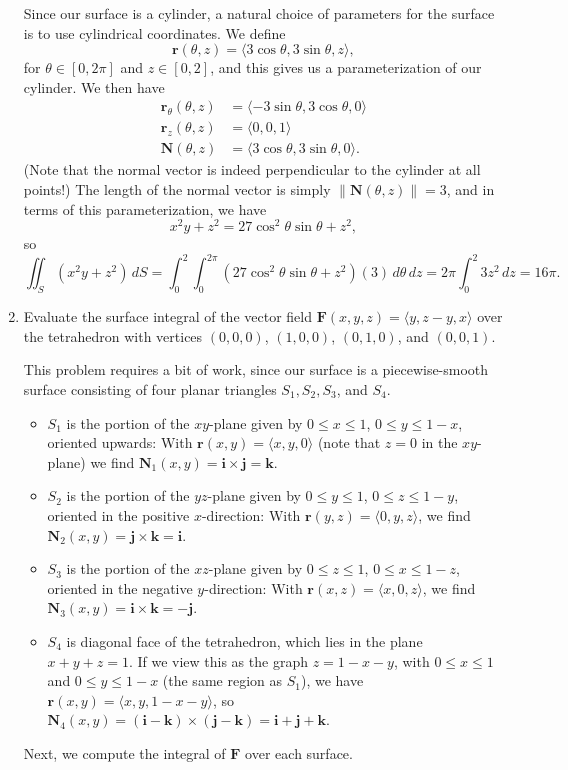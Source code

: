 \documentclass[letterpaper,12pt]{article}
\newcommand{\len}[1]{\lVert #1\rVert}
\newcommand{\F}{\mathbf{F}}
\renewcommand{\r}{\mathbf{r}}
\renewcommand{\i}{\mathbf{i}}
\renewcommand{\j}{\mathbf{j}}
\renewcommand{\k}{\mathbf{k}}
\newcommand{\N}{\mathbf{N}}
\begin{document}
\begin{enumerate}
Since our surface is a cylinder, a natural choice of parameters for the surface is to use cylindrical coordinates. We define
\[
 \r(\theta,z) = \langle 3\cos\theta, 3\sin\theta,z\rangle,
\]
for $\theta\in [0,2\pi]$ and $z\in [0,2]$, and this gives us a parameterization of our cylinder. We then have
\begin{align*}
 \r_\theta(\theta, z) & = \langle -3\sin\theta, 3\cos\theta, 0\rangle\\
 \r_z(\theta, z) & = \langle 0, 0, 1\rangle\\
 \N(\theta,z) & = \langle 3\cos\theta, 3\sin\theta, 0\rangle.
\end{align*}
(Note that the normal vector is indeed perpendicular to the cylinder at all points!) The length of the normal vector is simply $\len{\N(\theta,z)} = 3$, and in terms of this parameterization, we have
\[
 x^2y+z^2 = 27\cos^2\theta\sin\theta+z^2,
\]
so
\[
 \iint_S (x^2y+z^2)\,dS = \int_0^2\int_0^{2\pi}(27\cos^2\theta\sin\theta +z^2)(3)\,d\theta\,dz = 2\pi\int_0^2 3z^2\,dz = 16\pi.
\]


\item Evaluate the surface integral of the vector field $\F(x,y,z) = \langle y, z-y, x\rangle$ over the tetrahedron with vertices $(0,0,0)$, $(1,0,0)$, $(0,1,0)$, and $(0,0,1)$.

\bigskip

This problem requires a bit of work, since our surface is a piecewise-smooth surface consisting of four planar triangles $S_1, S_2, S_3$, and $S_4$.
\begin{itemize}
 \item $S_1$ is the portion of the $xy$-plane given by $0\leq x\leq 1$, $0\leq y\leq 1-x$, oriented upwards: With $\r(x,y) = \langle x,y,0\rangle$ (note that $z=0$ in the $xy$-plane) we find $\N_1(x,y) = \i\times\j = \k$. 
 \item $S_2$ is the portion of the $yz$-plane given by $0\leq y\leq 1$, $0\leq z\leq 1-y$, oriented in the positive $x$-direction: With $\r(y,z) = \langle 0,y,z\rangle$, we find $\N_2(x,y) =\j\times\k = \i$.
 \item $S_3$ is the portion of the $xz$-plane given by $0\leq z\leq 1$, $0\leq x\leq 1-z$, oriented in the negative $y$-direction: With $\r(x,z) = \langle x,0,z\rangle$, we find $\N_3(x,y) =\i\times\k = -\j$.
 \item $S_4$ is diagonal face of the tetrahedron, which lies in the plane $x+y+z=1$. If we view this as the graph $z=1-x-y$, with $0\leq x\leq 1$ and $0\leq y\leq 1-x$ (the same region as $S_1$), we have $\r(x,y) = \langle x,y,1-x-y\rangle$, so $\N_4(x,y) = (\i-\k)\times(\j-\k) = \i+\j+\k$.
\end{itemize}
Next, we compute the integral of $\F$ over each surface.


\end{enumerate}
\end{document}
